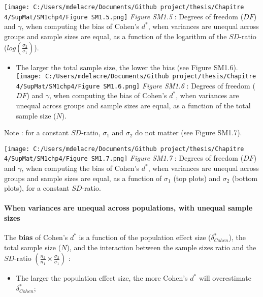 \documentclass[
  english,
  man,mask,floatsintext]{apa6}
\providecommand{\tightlist}{%
  \setlength{\itemsep}{0pt}\setlength{\parskip}{0pt}}
\let\oldparagraph\paragraph
\renewcommand{\paragraph}[1]{\oldparagraph{#1}\mbox{}}
\begin{document}
\texttt{[image: C:/Users/mdelacre/Documents/Github project/thesis/Chapitre 4/SupMat/SM1chp4/Figure SM1.5.png]}
\emph{Figure SM1.5} : Degrees of freedom (\(DF\)) and \(\gamma\), when computing the bias of Cohen's \(d^*\), when variances are unequal across groups and sample sizes are equal, as a function of the logarithm of the \(SD\)-ratio (\(log \left( \frac{\sigma_2}{\sigma_1} \right)\)).\\
\newpage

\begin{itemize}
\tightlist
\item
  The larger the total sample size, the lower the bias (see Figure SM1.6).\\
  \texttt{[image: C:/Users/mdelacre/Documents/Github project/thesis/Chapitre 4/SupMat/SM1chp4/Figure SM1.6.png]}
  \emph{Figure SM1.6} : Degrees of freedom (\(DF\)) and \(\gamma\), when computing the bias of Cohen's \(d^*\), when variances are unequal across groups and sample sizes are equal, as a function of the total sample size (\(N\)).
\end{itemize}

\newpage

Note : for a constant \(SD\)-ratio, \(\sigma_1\) and \(\sigma_2\) do not matter (see Figure SM1.7).

\texttt{[image: C:/Users/mdelacre/Documents/Github project/thesis/Chapitre 4/SupMat/SM1chp4/Figure SM1.7.png]}
\emph{Figure SM1.7} : Degrees of freedom (\(DF\)) and \(\gamma\), when computing the bias of Cohen's \(d^*\), when variances are unequal across groups and sample sizes are equal, as a function of \(\sigma_1\) (top plots) and \(\sigma_2\) (bottom plots), for a constant \(SD\)-ratio.

\hypertarget{when-variances-are-unequal-across-populations-with-unequal-sample-sizes}{%
\paragraph{When variances are unequal across populations, with unequal sample sizes}\label{when-variances-are-unequal-across-populations-with-unequal-sample-sizes}}

The \textbf{bias} of Cohen's \(d^*\) is a function of the population effect size (\(\delta^*_{Cohen}\)), the total sample size (\(N\)), and the interaction between the sample sizes ratio and the \(SD\)-ratio \(\left(\frac{n_2}{n_1}\times\frac{\sigma_2}{\sigma_1} \right)\) :

\begin{itemize}
\tightlist
\item
  The larger the population effect size, the more Cohen's \(d^*\) will overestimate \(\delta^*_{Cohen}\);
\end{itemize}
\end{document}
